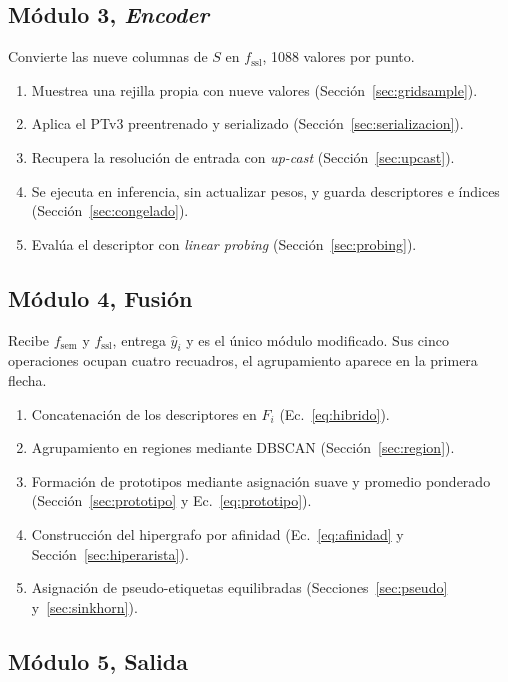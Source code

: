 \subsection{Módulo 3, \emph{Encoder}}
\label{sec:modulo3}

Convierte las nueve columnas de $S$ en $f_{\mathrm{ssl}}$, 1088 valores por punto.
\begin{enumerate}\setlength{\itemsep}{1pt}
\item Muestrea una rejilla propia con nueve valores (Sección~\ref{sec:gridsample}).
\item Aplica el PTv3 preentrenado y serializado (Sección~\ref{sec:serializacion}).
\item Recupera la resolución de entrada con \emph{up-cast} (Sección~\ref{sec:upcast}).
\item Se ejecuta en inferencia, sin actualizar pesos, y guarda descriptores e índices (Sección~\ref{sec:congelado}).
\item Evalúa el descriptor con \emph{linear probing} (Sección~\ref{sec:probing}).
\end{enumerate}

\subsection{Módulo 4, Fusión}
\label{sec:modulo4}

Recibe $f_{\mathrm{sem}}$ y $f_{\mathrm{ssl}}$, entrega $\hat{y}_i$ y es el único módulo modificado.
Sus cinco operaciones ocupan cuatro recuadros, el agrupamiento aparece en la primera flecha.
\begin{enumerate}\setlength{\itemsep}{1pt}
\item Concatenación de los descriptores en $F_i$ (Ec.~\eqref{eq:hibrido}).
\item Agrupamiento en regiones mediante DBSCAN (Sección~\ref{sec:region}).
\item Formación de prototipos mediante asignación suave y promedio ponderado
(Sección~\ref{sec:prototipo} y Ec.~\eqref{eq:prototipo}).
\item Construcción del hipergrafo por afinidad
(Ec.~\eqref{eq:afinidad} y Sección~\ref{sec:hiperarista}).
\item Asignación de pseudo-etiquetas equilibradas
(Secciones~\ref{sec:pseudo} y~\ref{sec:sinkhorn}).
\end{enumerate}

\subsection{Módulo 5, Salida}
\label{sec:modulo5}


